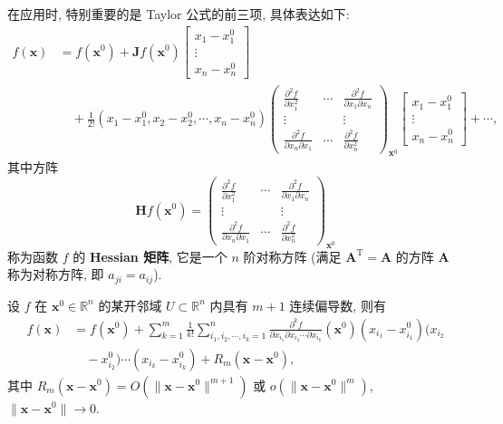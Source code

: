 在应用时, 特别重要的是 Taylor 公式的前三项, 具体表达如下:
\[
  \begin{aligned}
    f(\boldsymbol{x}) &= f(\boldsymbol{x}^{0}) + \boldsymbol{J}f(\boldsymbol{x}^{0})\begin{bmatrix} x_{1} - x_{1}^{0} \\ \vdots \\ x_{n} - x_{n}^{0} \end{bmatrix} \\
    &\quad + \frac{1}{2!}(x_{1} - x_{1}^{0}, x_{2} - x_{2}^{0}, \cdots, x_{n} - x_{n}^{0})\begin{pmatrix} \frac{\partial^{2}f}{\partial x_{1}^{2}} & \cdots & \frac{\partial^{2}f}{\partial x_{1}\partial x_{n}} \\ \vdots & & \vdots \\ \frac{\partial^{2}f}{\partial x_{n}\partial x_{1}} & \cdots & \frac{\partial^{2}f}{\partial x_{n}^{2}} \end{pmatrix}_{\boldsymbol{x}^{0}}\begin{bmatrix} x_{1} - x_{1}^{0} \\ \vdots \\ x_{n} - x_{n}^{0} \end{bmatrix} + \cdots,
  \end{aligned}
\]
其中方阵
\[
  \boldsymbol{H}f(\boldsymbol{x}^{0}) = \begin{pmatrix} \frac{\partial^{2}f}{\partial x_{1}^{2}} & \cdots & \frac{\partial^{2}f}{\partial x_{1}\partial x_{n}} \\ \vdots & & \vdots \\ \frac{\partial^{2}f}{\partial x_{n}\partial x_{1}} & \cdots & \frac{\partial^{2}f}{\partial x_{n}^{2}} \end{pmatrix}_{\boldsymbol{x}^{0}}
\]
称为函数 $f$ 的 \textbf{Hessian 矩阵}, 它是一个 $n$ 阶对称方阵 (满足 $\boldsymbol{A}^{\mathrm{T}} = \boldsymbol{A}$ 的方阵 $\boldsymbol{A}$ 称为对称方阵, 即 $a_{ji} = a_{ij}$).

\begin{theorem}\label{thm:8.3.2}
设 $f$ 在 $\boldsymbol{x}^{0} \in \mathbb{R}^{n}$ 的某开邻域 $U \subset \mathbb{R}^{n}$ 内具有 $m + 1$ 连续偏导数, 则有
\begin{align*}
  f(\boldsymbol{x}) &= f(\boldsymbol{x}^{0}) + \sum_{k=1}^{m}\frac{1}{k!}\sum_{i_{1}, i_{2}, \cdots, i_{k}=1}^{n}\frac{\partial^{k}f}{\partial x_{i_{1}}\partial x_{i_{2}}\cdots\partial x_{i_{k}}}(\boldsymbol{x}^{0})(x_{i_{1}} - x_{i_{1}}^{0})(x_{i_{2}} \\
  &\quad - x_{i_{2}}^{0})\cdots(x_{i_{k}} - x_{i_{k}}^{0}) + R_{m}(\boldsymbol{x} - \boldsymbol{x}^{0}),
\end{align*}
其中 $R_{m}(\boldsymbol{x} - \boldsymbol{x}^{0}) = O(\|\boldsymbol{x} - \boldsymbol{x}^{0}\|^{m+1})$ 或 $o(\|\boldsymbol{x} - \boldsymbol{x}^{0}\|^{m})$, $\|\boldsymbol{x} - \boldsymbol{x}^{0}\| \to 0$.
\end{theorem}

